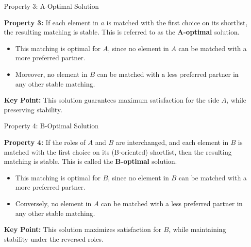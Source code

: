 \documentclass[aspectratio=169,xcolor=dvipsnames]{beamer}
\begin{document}
\begin{frame}{Property 3: A-Optimal Solution}

\textbf{Property 3:} If each element in \( a \) is matched with the first choice on its shortlist, the resulting matching is stable. This is referred to as the \textbf{A-optimal} solution.
\pause
\begin{itemize}
  \item This matching is optimal for \( A \), since no element in \( A \) can be matched with a more preferred partner.
  \item Moreover, no element in \( B \) can be matched with a less preferred partner in any other stable matching.
\end{itemize}
\pause
\textbf{Key Point:} This solution guarantees maximum satisfaction for the side \( A \), while preserving stability.
\end{frame}

\begin{frame}{Property 4: B-Optimal Solution}

\textbf{Property 4:} If the roles of \( A \) and \( B \) are interchanged, and each element in \( B \) is matched with the first choice on its (B-oriented) shortlist, then the resulting matching is stable. This is called the \textbf{B-optimal} solution.
\pause
\begin{itemize}
  \item This matching is optimal for \( B \), since no element in \( B \) can be matched with a more preferred partner.
  \item Conversely, no element in \( A \) can be matched with a less preferred partner in any other stable matching.
\end{itemize}
\pause
\textbf{Key Point:} This solution maximizes satisfaction for \( B \), while maintaining stability under the reversed roles.
\end{frame}
\end{document}
